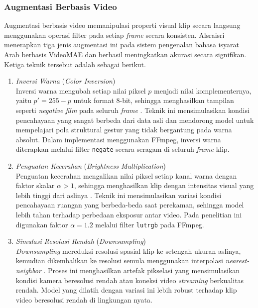 \subsubsection{Augmentasi Berbasis Video} \label{II.Augmentasi.Video}
Augmentasi berbasis video memanipulasi properti visual klip secara langsung menggunakan operasi filter pada setiap \textit{frame} secara konsisten. Alsraisri \cite{Alsraisri2025} menerapkan tiga jenis augmentasi ini pada sistem pengenalan bahasa isyarat Arab berbasis VideoMAE dan berhasil meningkatkan akurasi secara signifikan. Ketiga teknik tersebut adalah sebagai berikut.

\begin{enumerate}
  \item \textit{Inversi Warna} (\textit{Color Inversion})\\
  Inversi warna mengubah setiap nilai piksel $p$ menjadi nilai komplementernya, yaitu $p' = 255 - p$ untuk format 8-bit, sehingga menghasilkan tampilan seperti \textit{negative film} pada seluruh \textit{frame} \cite{Alsraisri2025}. Teknik ini mensimulasikan kondisi pencahayaan yang sangat berbeda dari data asli dan mendorong model untuk mempelajari pola struktural gestur yang tidak bergantung pada warna absolut. Dalam implementasi menggunakan FFmpeg, inversi warna diterapkan melalui filter \texttt{negate} secara seragam di seluruh \textit{frame} klip.

  \item \textit{Penguatan Kecerahan} (\textit{Brightness Multiplication})\\
  Penguatan kecerahan mengalikan nilai piksel setiap kanal warna dengan faktor skalar $\alpha > 1$, sehingga menghasilkan klip dengan intensitas visual yang lebih tinggi dari aslinya \cite{Alsraisri2025,AIMS2024}. Teknik ini mensimulasikan variasi kondisi pencahayaan ruangan yang berbeda-beda saat perekaman, sehingga model lebih tahan terhadap perbedaan eksposur antar video. Pada penelitian ini digunakan faktor $\alpha = 1.2$ melalui filter \texttt{lutrgb} pada FFmpeg.

  \item \textit{Simulasi Resolusi Rendah} (\textit{Downsampling})\\
  \textit{Downsampling} mereduksi resolusi spasial klip ke setengah ukuran aslinya, kemudian dikembalikan ke resolusi semula menggunakan interpolasi \textit{nearest-neighbor} \cite{Alsraisri2025}. Proses ini menghasilkan artefak pikselasi yang mensimulasikan kondisi kamera beresolusi rendah atau koneksi video \textit{streaming} berkualitas rendah. Model yang dilatih dengan variasi ini lebih robust terhadap klip video beresolusi rendah di lingkungan nyata.
\end{enumerate}


